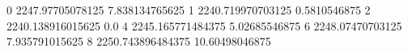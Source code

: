 0 2247.97705078125 7.838134765625
1 2240.719970703125 0.5810546875
2 2240.138916015625 0.0
4 2245.165771484375 5.02685546875
6 2248.07470703125 7.935791015625
8 2250.743896484375 10.60498046875
